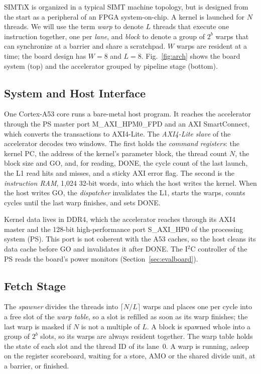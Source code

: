 \documentclass[journal]{IEEEtran}
\begin{document}
SIMTiX is organized in a typical SIMT machine topology, but is designed from the
start as a peripheral of an FPGA system-on-chip. A kernel is launched for $N$
threads. We will use the term \emph{warp} to denote $L$ threads that execute one
instruction together, one per \emph{lane}, and \emph{block} to denote a group of
$2^b$ warps that can synchronize at a barrier and share a scratchpad. $W$ warps are
resident at a time; the board design has $W=8$ and $L=8$. Fig.~\ref{fig:arch}
shows the board system (top) and the accelerator grouped by pipeline stage
(bottom).

\subsection{System and Host Interface}
One Cortex-A53 core runs a bare-metal host program. It reaches the accelerator
through the PS master port M\_AXI\_HPM0\_FPD and an AXI SmartConnect, which
converts the transactions to AXI4-Lite. The \emph{AXI4-Lite slave} of the
accelerator decodes two windows. The first holds the \emph{command registers}:
the kernel PC, the address of the kernel's parameter block, the thread count $N$,
the block size and GO, and, for reading, DONE, the cycle count of the last
launch, the L1 read hits and misses, and a sticky AXI error flag. The second is
the \emph{instruction RAM}, 1,024 32-bit words, into which the host writes the
kernel. When the host writes GO, the \emph{dispatcher} invalidates the L1, starts
the warps, counts cycles until the last warp finishes, and sets DONE.

Kernel data lives in DDR4, which the accelerator reaches through its AXI4 master
and the 128-bit high-performance port S\_AXI\_HP0 of the processing system (PS).
This port is not coherent with the A53 caches, so the host cleans its data cache
before GO and invalidates it after DONE. The I$^2$C controller of the PS reads the
board's power monitors (Section~\ref{sec:evalboard}).

\subsection{Fetch Stage}
The \emph{spawner} divides the threads into $\lceil N/L\rceil$ warps and places
one per cycle into a free slot of the \emph{warp table}, so a slot is refilled as
soon as its warp finishes; the last warp is masked if $N$ is not a multiple of
$L$. A block is spawned whole into a group of $2^b$ slots, so its warps are always
resident together. The warp table holds the state of each slot and the thread ID
of its lane~0. A warp is running, asleep on the register scoreboard, waiting for
a store, AMO or the shared divide unit, at a barrier, or finished.
\end{document}
